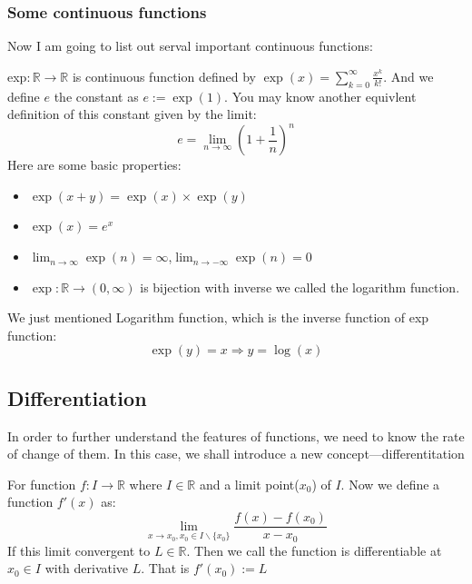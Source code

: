 \documentclass{article}
\newcommand{\R}{\mathbb{R}}
\begin{document}
\subsubsection{Some continuous functions}\label{contfunc}
Now I am going to list out serval important continuous functions:
\begin{example}
	exp$:\R\to\R$ is continuous function defined by $\exp(x)=\sum_{k=0}^\infty \frac{x^k}{k!}$. And we define $e$ the constant as $e:=\exp(1)$. You may know another equivlent definition of this constant given by the limit:
	\begin{equation*}
		e=\lim_{n\to \infty}(1+\frac{1}{n})^n
	\end{equation*}
	Here are some basic properties:
	\begin{itemize}
		\item $\exp(x+y)=\exp(x)\times\exp(y)$
		\item $\exp(x)=e^x$
		\item $\lim_{n\to \infty}\exp(n)=\infty$,$\lim_{n\to -\infty}\exp(n)=0$
		\item $\exp : \R \to (0,\infty)$ is bijection with inverse we called the logarithm function.
	\end{itemize}
	We just mentioned Logarithm function, which is the inverse function of exp function:
	\begin{equation*}
		\exp(y)=x\Rightarrow y=\log(x)
	\end{equation*}
\end{example}






\subsection{Differentiation}
In order to further understand the features of functions, we need to know the rate of change of them. In this case, we shall introduce a new concept---differentitation
\begin{definition}
For function $f:I\to \R$ where $I\in \R$ and a limit point($x_0$) of $I$. Now we define a function $f'(x)$ as:
\begin{equation*}
	\lim_{x\to x_0,x_0\in I\backslash \{x_0\}} \frac{f(x)-f(x_0)}{x-x_0}
\end{equation*}
If this limit convergent to $L\in \R$. Then we call the function is differentiable at $x_0\in I$ with derivative $L$. That is $f'(x_0):=L$
\end{definition}
\end{document}
